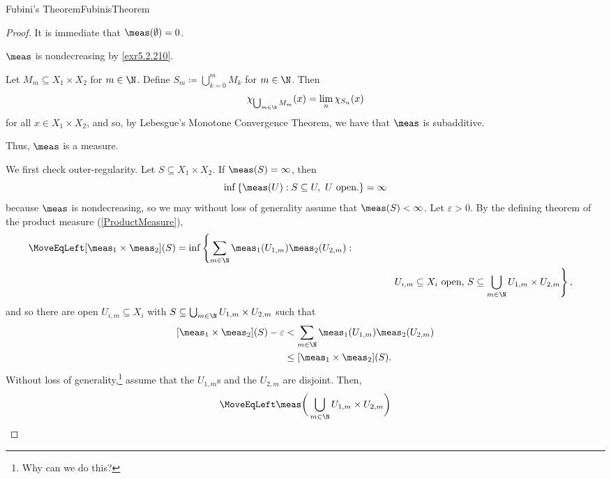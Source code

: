 \begin{thm}{Fubini's Theorem}{FubinisTheorem}
\begin{proof}
It is immediate that $\meas (\emptyset )=0$.

$\meas$ is nondecreasing by \cref{exr5.2.210}.

Let $M_m\subseteq X_1\times X_2$ for $m\in \N$.  Define $S_m\coloneqq \bigcup _{k=0}^mM_k$ for $m\in \N$.  Then
\begin{equation}
\chi _{\bigcup _{m\in \N}M_m}(x)=\lim _n\chi _{S_n}(x)
\end{equation}
for all $x\in X_1\times X_2$, and so, by Lebesgue's Monotone Convergence Theorem, we have that $\meas$ is subadditive.

Thus, $\meas$ is a measure.

We first check outer-regularity.  Let $S\subseteq X_1\times X_2$.  If $\meas (S)=\infty$, then
\begin{equation}
\inf \left\{ \meas (U):S\subseteq U,\ U\text{ open.}\right\} =\infty
\end{equation}
because $\meas$ is nondecreasing, so we may without loss of generality assume that $\meas (S)<\infty$.  Let $\varepsilon >0$.  By the defining theorem of the product measure (\cref{ProductMeasure}),
\begin{equation*}
\begin{split}
\MoveEqLeft
[\meas _1\times \meas _2](S)=\inf \left\{ \sum _{m\in \N}\meas _1(U_{1,m})\meas _2(U_{2,m}):\right. \\ & \qquad \qquad \left. U_{i,m}\subseteq X_i\text{ open, }S\subseteq \bigcup _{m\in \N}U_{1,m}\times U_{2,m}\right\} ,
\end{split}
\end{equation*}
and so there are open $U_{i,m}\subseteq X_i$ with $S\subseteq \bigcup _{m\in \N}U_{1,m}\times U_{2,m}$ such that
\begin{equation}\label{eqn5.2.244}
\begin{split}
[\meas _1\times \meas _2](S)-\varepsilon & <\sum _{m\in \N}\meas _1(U_{1,m})\meas _2(U_{2,m}) \\
& \leq [\meas _1\times \meas _2](S).
\end{split}
\end{equation}
Without loss of generality,\footnote{Why can we do this?} assume that the $U_{1,m}$s and the $U_{2,m}$ are disjoint.  Then,
{\footnotesize
\begin{equation}
\begin{split}
\MoveEqLeft
\meas \bigg( \bigcup _{m\in \N}U_{1,m}\times U_{2,m}\bigg) \\

\end{split}
\end{equation}}
\end{proof}
\end{thm}
